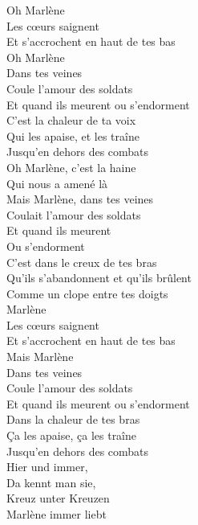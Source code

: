 Oh Marlène\\
Les cœurs saignent\\
Et s'accrochent en haut de tes bas\\
Oh Marlène\\
Dans tes veines\\
Coule l'amour des soldats\\
Et quand ils meurent ou s'endorment\\
C'est la chaleur de ta voix\\
Qui les apaise, et les traîne\\
Jusqu'en dehors des combats\\
Oh Marlène, c'est la haine\\
Qui nous a amené là\\
Mais Marlène, dans tes veines\\
Coulait l'amour des soldats\\
Et quand ils meurent\\
Ou s'endorment\\
C'est dans le creux de tes bras\\
Qu'ils s'abandonnent et qu'ils brûlent\\
Comme un clope entre tes doigts\\
Marlène\\
Les cœurs saignent\\
Et s'accrochent en haut de tes bas\\
Mais Marlène\\
Dans tes veines\\
Coule l'amour des soldats\\
Et quand ils meurent ou s'endorment\\
Dans la chaleur de tes bras\\
Ça les apaise, ça les traîne\\
Jusqu'en dehors des combats\\
Hier und immer,\\
Da kennt man sie,\\
Kreuz unter Kreuzen\\
Marlène immer liebt\\